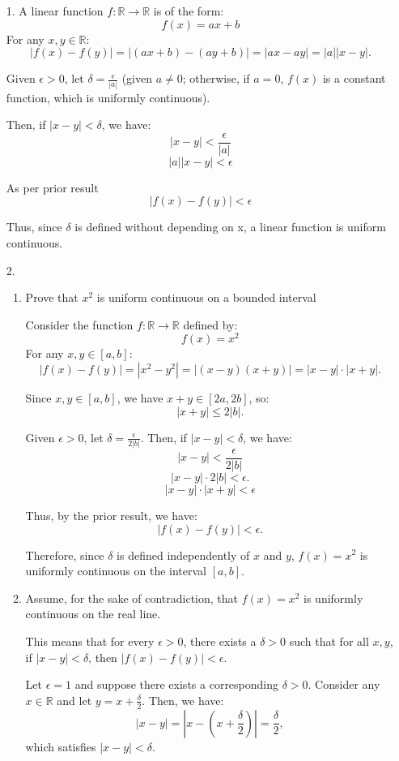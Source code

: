 \documentclass[12pt]{article}
\begin{document}
 
\begin{enumerate}[start=1,label={\bfseries. },leftmargin=1in]
\item [1. ]
A linear function $ f: \mathbb{R} \rightarrow \mathbb{R} $ is of the form:
\[
f(x) = ax + b
\]
For any \( x, y \in \mathbb{R} \):
\[
|f(x) - f(y)| = |(ax + b) - (ay + b)| = |ax - ay| = |a| |x - y|.
\]

Given $\epsilon > 0$, let \( \delta = \frac{\epsilon}{|a|} \) (given \( a \neq 0 \); otherwise, if \( a = 0 \), \( f(x) \) is a constant function, which is uniformly continuous).

Then, if \( |x - y| < \delta \), we have:
\[
|x-y| < \frac{\epsilon}{|a|}
\]
\[
|a||x-y| < \epsilon
\]

As per prior result
\[
|f(x) - f(y)| < \epsilon
\]

Thus, since $\delta$ is defined without depending on x, a linear function is uniform continuous.

\item [2.] 
\begin{enumerate}
    \item Prove that $x^2$ is uniform continuous on a bounded interval

    Consider the function \( f: \mathbb{R} \rightarrow \mathbb{R} \) defined by:
\[
f(x) = x^2
\]
For any \( x, y \in [a, b] \):
\[
|f(x) - f(y)| = |x^2 - y^2| = |(x - y)(x + y)| = |x - y| \cdot |x + y|.
\]

Since \( x, y \in [a, b] \), we have \( x + y \in [2a, 2b] \), so:
\[
|x + y| \leq 2|b|.
\]

Given \( \epsilon > 0 \), let \( \delta = \frac{\epsilon}{2|b|} \). Then, if \( |x - y| < \delta \), we have:
\[
|x - y| < \frac{\epsilon}{2|b|}
\]
\[
|x - y| \cdot 2|b| < \epsilon.
\]
\[
|x-y|\cdot|x+y| < \epsilon
\]

Thus, by the prior result, we have:
\[
|f(x) - f(y)| < \epsilon.
\]

Therefore, since \( \delta \) is defined independently of \( x \) and \( y \), \( f(x) = x^2 \) is uniformly continuous on the interval \( [a, b] \).

\item
Assume, for the sake of contradiction, that \( f(x) = x^2 \) is uniformly continuous on the real line.

This means that for every \( \epsilon > 0 \), there exists a \( \delta > 0 \) such that for all \( x, y \), if \( |x - y| < \delta \), then \( |f(x) - f(y)| < \epsilon \).

Let \( \epsilon = 1 \) and suppose there exists a corresponding \( \delta > 0 \). Consider any \( x \in \mathbb{R}\) and let \( y = x + \frac{\delta}{2} \). Then, we have:
\[
|x - y| = \left| x - \left( x + \frac{\delta}{2} \right) \right| = \frac{\delta}{2},
\]
which satisfies \( |x - y| < \delta \).


\end{enumerate}
\end{enumerate}
\end{document}
